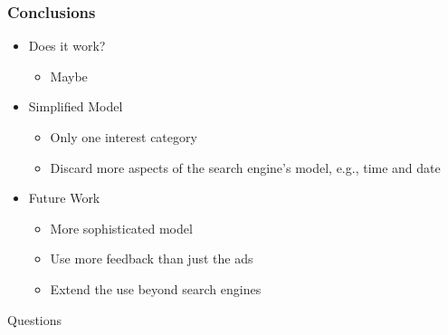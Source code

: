 \documentclass{beamer}
\begin{document}

\begin{frame}
	\frametitle{Conclusions}
	\begin{itemize}
		\item Does it work?
		\begin{itemize}
			\item Maybe
		\end{itemize}
		\item Simplified Model
		\begin{itemize}
			\item Only one interest category
			\item Discard more aspects of the search engine’s model, e.g., time and date
		\end{itemize}
		\item Future Work
		\begin{itemize}
			\item More sophisticated model
			\item Use more feedback than just the ads
			\item Extend the use beyond search engines
		\end{itemize}
	\end{itemize}
\end{frame}


\begin{frame}
\Huge{\centerline{Questions}}
\end{frame}

\end{document}
